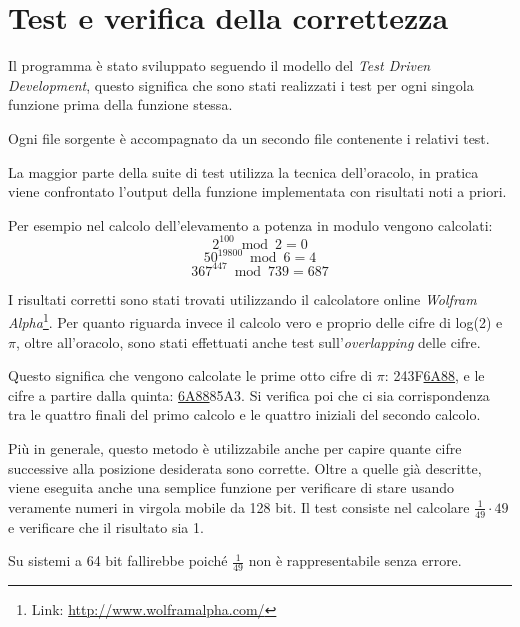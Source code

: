 \section{Test e verifica della correttezza}
Il programma è stato sviluppato seguendo il modello del \textit{Test Driven Development}, questo significa che sono stati realizzati i test per ogni singola funzione prima della funzione stessa.

Ogni file sorgente è accompagnato da un secondo file contenente i relativi test.

\noindent La maggior parte della suite di test utilizza la tecnica dell'oracolo, in pratica viene confrontato l'output della funzione implementata con risultati noti a priori.

Per esempio nel calcolo dell'elevamento a potenza in modulo vengono calcolati:
$$ 2^{100} \bmod 2 = 0 $$
$$ 50^{19800} \bmod 6 = 4 $$
$$ 367^{447} \bmod 739 = 687 $$

I risultati corretti sono stati trovati utilizzando il calcolatore online \textit{Wolfram Alpha}\footnote{Link: \href{http://www.wolframalpha.com/}{http://www.wolframalpha.com/}}.
\newline \newline
\noindent Per quanto riguarda invece il calcolo vero e proprio delle cifre di log(2) e $\pi$, oltre all'oracolo, sono stati effettuati anche test sull'\textit{overlapping} delle cifre.

Questo significa che vengono calcolate le prime otto cifre di $\pi$: 243F\underline{6A88}, e le cifre a partire dalla quinta: \underline{6A88}85A3. Si verifica poi che ci sia corrispondenza tra le quattro finali del primo calcolo e le quattro iniziali del secondo calcolo.

Più in generale, questo metodo è utilizzabile anche per capire quante cifre successive alla posizione desiderata sono corrette.
\newline \newline
\noindent Oltre a quelle già descritte, viene eseguita anche una semplice funzione per verificare di stare usando veramente numeri in virgola mobile da 128 bit. Il test consiste nel calcolare $\frac{1}{49} \cdot 49$ e verificare che il risultato sia 1.

Su sistemi a 64 bit fallirebbe poiché $\frac{1}{49}$ non è rappresentabile senza errore.
